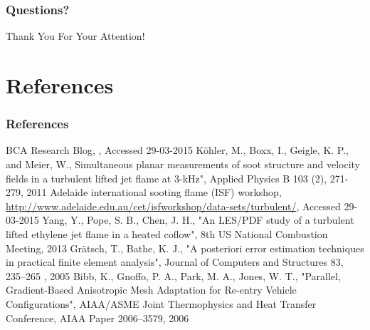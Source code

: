 \documentclass{beamer}
\begin{document}
\begin{frame}
\frametitle{Questions?}
\begin{center}
{\huge Thank You For Your Attention!} \\
\vspace*{1.5cm}
\end{center}
\end{frame}

\appendix
{}
\setcounter{finalframe}{\value{framenumber}}

\section{References}
\begin{frame}
\frametitle{References}

\begin{minipage}[t][1\textheight]{1\textwidth}
\vspace{-20pt}
\begin{exampleblock}{}

\begin{tiny}

\begin{thebibliography}{1} %
\beamertemplatetextbibitems
{}
BCA Research Blog, , Accessed 29-03-2015
K{\"o}hler, M., Boxx, I., Geigle, K. P., and Meier, W., \newblock Simultaneous planar measurements of soot structure and velocity fields in a turbulent lifted jet flame at 3-kHz", Applied Physics B 103 (2), 271-279, 2011  
Adelaide international sooting flame (ISF) workshop, \newblock \url{http://www.adelaide.edu.au/cet/isfworkshop/data-sets/turbulent/}, Accessed 29-03-2015
Yang, Y., Pope, S. B., Chen, J. H., \newblock "An LES/PDF study of a turbulent lifted ethylene jet flame in a heated coflow", 8th US National Combustion Meeting, 2013
Gr{\"a}tsch, T., Bathe, K. J., \newblock "A posteriori error estimation techniques in practical finite element analysis", Journal of Computers and Structures 83, 235–265 , 2005 
Bibb, K., Gnoffo, P. A., Park, M. A., Jones, W. T., \newblock "Parallel, Gradient-Based Anisotropic Mesh Adaptation for Re-entry Vehicle Configurations",  AIAA/ASME Joint Thermophysics and Heat Transfer Conference, AIAA Paper 2006–3579, 2006 

\end{thebibliography}
\end{tiny}

\end{exampleblock}
\end{minipage}


\end{frame}
\end{document}
